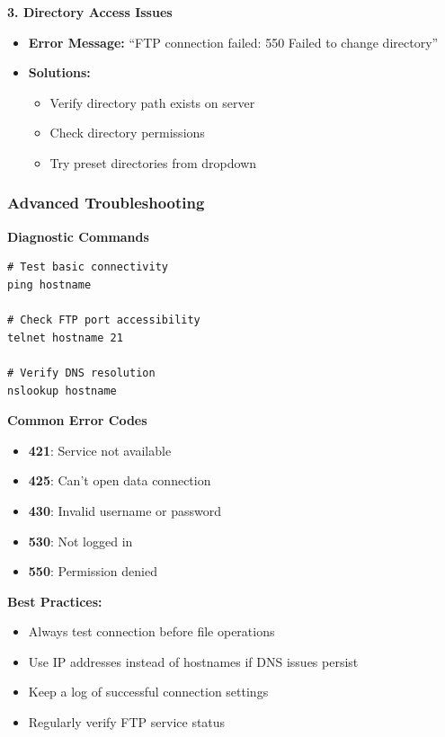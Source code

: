 \documentclass[a4paper,11pt]{report}
\begin{document}
\begin{procedurebox}
\textbf{3. Directory Access Issues}
\begin{itemize}
    \item \textbf{Error Message:} ``FTP connection failed: 550 Failed to change directory''
    \item \textbf{Solutions:}
    \begin{itemize}
        \item Verify directory path exists on server
        \item Check directory permissions
        \item Try preset directories from dropdown
    \end{itemize}
\end{itemize}
\end{procedurebox}

\pagebreak
\subsubsection{Advanced Troubleshooting}
\begin{procedurebox}
\textbf{Diagnostic Commands}
\begin{verbatim}
# Test basic connectivity
ping hostname

# Check FTP port accessibility
telnet hostname 21

# Verify DNS resolution
nslookup hostname
\end{verbatim}

\textbf{Common Error Codes}
\begin{itemize}
    \item \textbf{421}: Service not available
    \item \textbf{425}: Can't open data connection
    \item \textbf{430}: Invalid username or password
    \item \textbf{530}: Not logged in
    \item \textbf{550}: Permission denied
\end{itemize}
\end{procedurebox}

\begin{tipbox}
\textbf{Best Practices:}
\begin{itemize}
    \item Always test connection before file operations
    \item Use IP addresses instead of hostnames if DNS issues persist
    \item Keep a log of successful connection settings
    \item Regularly verify FTP service status
\end{itemize}
\end{tipbox}
\end{document}
